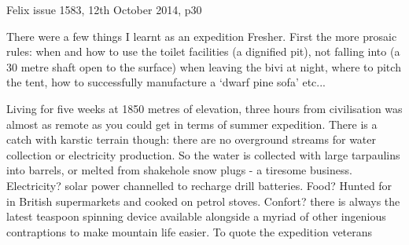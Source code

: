 \begin{marginfigure}
\checkoddpage \ifoddpage \forcerectofloat \else \forceversofloat \fi
\centering
{}
\caption{Felix issue 1583, 12th October 2014, p30 }
\label{felix article}
\end{marginfigure}

There were a few things I learnt as an expedition Fresher. First the more prosaic rules: when and how to use the toilet facilities (a dignified pit), not falling into  (a 30 metre shaft open to the surface) when leaving the bivi at night, where to pitch the tent, how to successfully manufacture a `dwarf pine sofa' etc... 

Living for five weeks at 1850 metres of elevation, three hours from civilisation was almost as remote as you could get in terms of summer expedition. There is a catch with karstic terrain though: there are no overground streams for water collection or electricity production. So the water is collected with large tarpaulins into barrels, or melted from shakehole snow plugs - a tiresome business. Electricity? solar power channelled to recharge drill batteries.  Food? Hunted for in British supermarkets and cooked on petrol stoves. Confort? there is always the latest teaspoon spinning device available alongside a myriad of other ingenious contraptions to make mountain life easier. To quote the expedition veterans 

